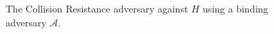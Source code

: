 \begin{figure}[t]
\begin{algorithm}[H]
    \caption{\label{alg.collision-resistance-adversary} The Collision Resistance adversary against $H$ using a binding adversary $\mathcal{A}$.}
    \begin{algorithmic}[1]
            \State{}
        \EndFunction
    \end{algorithmic}
\end{algorithm}
\end{figure}
